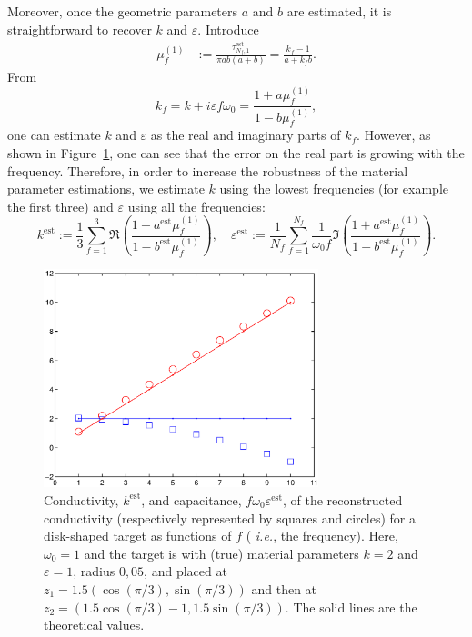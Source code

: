Moreover, once the geometric parameters $a$ and $b$ are estimated,
it is straightforward to recover $k$ and $\varepsilon$. Introduce
\[
\begin{alignedat}{1}\mu_{f}^{(1)} & :=\frac{\tau_{N_f,1}^{\mbox {est}}}{\pi ab(a+b)}=\frac{k_{f}-1}{a+k_{f}b}.\end{alignedat}
\]
From
\[
k_{f} = k+ i \varepsilon f \omega_0 =
\frac{1+a\mu_{f}^{(1)}}{1-b\mu_{f}^{(1)}},
\]
one can estimate $k$ and $\varepsilon$ as the real and imaginary
parts of $k_f$. However, as shown in
Figure~\ref{fig:param_phys_est}, one can see that the error on the
real part is growing with the frequency. Therefore, in order to
increase the robustness of the material parameter estimations, we
estimate $k$ using the lowest frequencies (for example the first
three) and $\varepsilon$ using all the frequencies:
\begin{equation}
k^{\textrm{est}} :=\frac{1}{3}\sum_{f=1}^{3}\Re\left(\frac{1+a^{\textrm{est}}
\mu_{f}^{(1)}}{1-b^{\textrm{est}}\mu_{f}^{(1)}}\right),\quad
\varepsilon^{\textrm{est}}
:=\frac{1}{N_f}\sum_{f=1}^{N_f}\frac{1}{\omega_{0}f}\Im\left(\frac{1+a^{\textrm{est}}
\mu_{f}^{(1)}}{1-b^{\textrm{est}}\mu_{f}^{(1)}}\right).
\label{eq:phys_param_est}
\end{equation}

\begin{figure}[!h]
\centering\includegraphics[width=8cm]{model/k_n_estimation}
\caption{\label{fig:param_phys_est}Conductivity, $k^{\textrm{est}}$, and
capacitance, $f \omega_0 \varepsilon^{\textrm{est}}$, of the
reconstructed conductivity (respectively represented by squares
and circles) for a disk-shaped target as functions of $f$ (\emph{
i.e.}, the frequency). Here, $\omega_0=1$ and the target is with
(true) material parameters $k=2$ and $\varepsilon=1$, radius
$0,05$, and placed at $z_{1}=1.5(\cos(\pi/3),\sin(\pi/3))$ and
then at $z_{2}=(1.5\cos(\pi/3)-1,1.5\sin(\pi/3))$. The solid lines
are the theoretical values.}
\end{figure}

